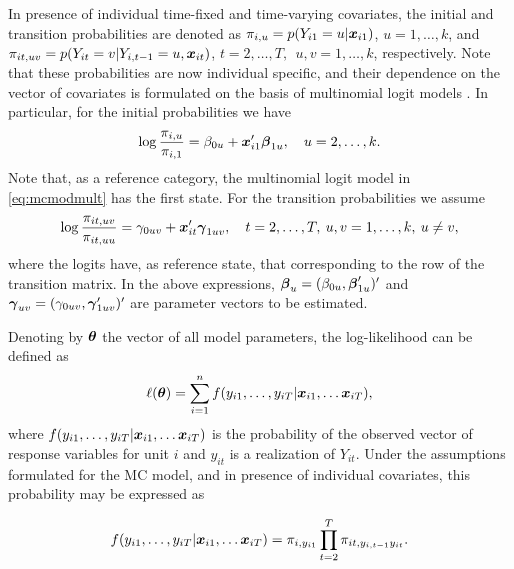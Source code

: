In presence of individual time-fixed and time-varying covariates, the
initial and transition probabilities are denoted as
\(\pi_{i,u}= p(Y_{i1} = u |\mbox{\boldmath $x$}_{i1})\), \(u=1,\ldots,k\), and
\(\pi_{it,uv} = p(Y_{it} = v | Y_{i,t-1}= u, \mbox{\boldmath $x$}_{it})\),
\(t=2,\ldots,T,\:\ u,v=1,\ldots,k\), respectively. Note that these
probabilities are now individual specific, and their dependence on the
vector of covariates is formulated on the basis of multinomial logit
models \citep{azzalini:94}. In particular, for the initial probabilities
we have
\begin{equation}
\log\frac{\pi_{i,u}}{\pi_{i,1}}= \beta_{0u} + \mbox{\boldmath $x$}_{i1}^\prime \mbox{\boldmath $\beta$}_{1u},\quad u=2,\ldots,k.
\label{eq:mcmodmult}
\end{equation} Note that, as a reference category, the multinomial logit
model in \eqref{eq:mcmodmult} has the first state. For the transition
probabilities we assume \begin{equation}
\log\frac{\pi_{it,uv}}{\pi_{it,uu}}= \gamma_{0uv} + \mbox{\boldmath $x$}_{it}^\prime \mbox{\boldmath $\gamma$}_{1uv},\quad t=2,\ldots,T, \: u,v = 1,\ldots,k,\: u \neq v,
 \label{eq:mcmodmult2}
\end{equation} where the logits have, as reference state, that
corresponding to the row of the transition matrix. In the above
expressions, \(\mbox{\boldmath $\beta$}_u = (\beta_{0u}, \mbox{\boldmath $\beta$}_{1u}^\prime)^\prime\)
and \(\mbox{\boldmath $\gamma$}_{uv} = (\gamma_{0uv},\mbox{\boldmath $\gamma$}_{1uv}^\prime)^\prime\)
are parameter vectors to be estimated.

Denoting by \(\mbox{\boldmath $\theta$}\) the vector of all model parameters, the
log-likelihood can be defined as \[
\ell(\mbox{\boldmath $\theta$}) = \sum_{i=1}^n f(y_{i1},\ldots,y_{iT}|\mbox{\boldmath $x$}_{i1},\ldots \mbox{\boldmath $x$}_{iT}),
\] where \(f(y_{i1},\ldots,y_{iT}|\mbox{\boldmath $x$}_{i1},\ldots \mbox{\boldmath $x$}_{iT})\) is the
probability of the observed vector of response variables for unit \(i\)
and \(y_{it}\) is a realization of \(Y_{it}\). Under the assumptions
formulated for the MC model, and in presence of individual covariates,
this probability may be expressed as

\[
f(y_{i1},\ldots,y_{iT}|\mbox{\boldmath $x$}_{i1},\ldots \mbox{\boldmath $x$}_{iT}) = \pi_{i,y_{i1}} \prod_{t=2}^{T}\pi_{it,y_{i,t-1}y_{it}}.
\]

